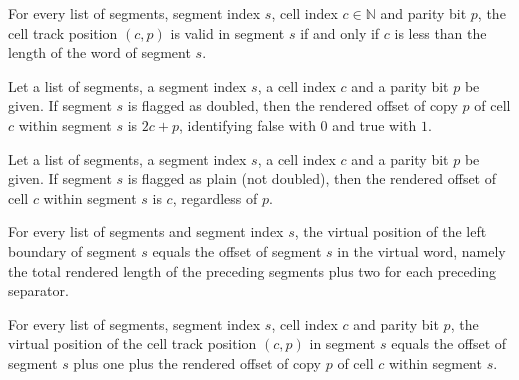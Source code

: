 \begin{lemma}
\label{Complexity.LogProg.TPos.valid_cell_iff}
\leanok
{}
For every list of segments, segment index $s$, cell index $c\in\mathbb{N}$ and parity bit
$p$, the cell track position $(c,p)$ is valid in segment $s$ if and only if $c$ is less
than the length of the word of segment $s$.
\end{lemma}

\begin{lemma}
\label{Complexity.LogProg.cellOff_of_doubled}
\leanok
{}
Let a list of segments, a segment index $s$, a cell index $c$ and a parity bit $p$ be
given. If segment $s$ is flagged as doubled, then the rendered offset of copy $p$ of
cell $c$ within segment $s$ is $2c+p$, identifying false with $0$ and true with $1$.
\end{lemma}

\begin{lemma}
\label{Complexity.LogProg.cellOff_of_plain}
\leanok
{}
Let a list of segments, a segment index $s$, a cell index $c$ and a parity bit $p$ be
given. If segment $s$ is flagged as plain (not doubled), then the rendered offset of
cell $c$ within segment $s$ is $c$, regardless of $p$.
\end{lemma}

\begin{lemma}
\label{Complexity.LogProg.vpos_left}
\leanok
{}
For every list of segments and segment index $s$, the virtual position of the left
boundary of segment $s$ equals the offset of segment $s$ in the virtual word, namely the
total rendered length of the preceding segments plus two for each preceding separator.
\end{lemma}

\begin{lemma}
\label{Complexity.LogProg.vpos_cell}
\leanok
{}
For every list of segments, segment index $s$, cell index $c$ and parity bit $p$, the
virtual position of the cell track position $(c,p)$ in segment $s$ equals the offset of
segment $s$ plus one plus the rendered offset of copy $p$ of cell $c$ within segment
$s$.
\end{lemma}

